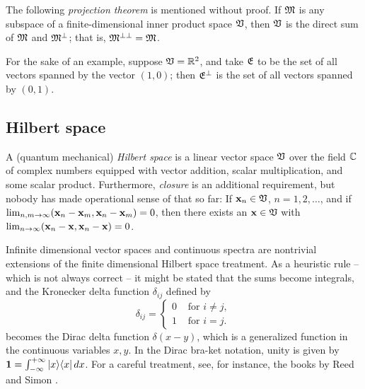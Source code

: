 The following {\em projection theorem}
is mentioned without proof.
If ${\frak M}$ is any subspace of a finite-dimensional inner product space ${\frak V}$,
then ${\frak V}$ is the direct sum of ${\frak M}$ and ${\frak M}^\perp$;
that is, ${\frak M}^{\perp \perp}={\frak M}$.

{
\color{blue}
\bexample
For the sake of an example, suppose ${\frak V}={\Bbb R}^2$,
and take ${\frak E}$ to be the set of all vectors spanned by the vector $(1,0)$;
then ${\frak E}^\perp$ is the set of all vectors spanned by $(0,1)$.
\eexample
}


\subsection{Hilbert space}


A (quantum mechanical) {\em Hilbert space} is a linear
vector space ${\frak V}$ over the field ${\Bbb C}$ of complex numbers
equipped with vector addition, scalar multiplication, and some scalar product.
Furthermore, {\em closure} is an additional requirement,
but nobody has made operational sense of that so far:
If ${\bf x}_n\in {\frak V}$, $n=1,2,\ldots$, and if $\lim_{n,m\rightarrow
\infty} ({\bf x}_n-{\bf x}_m,{\bf x}_n-{\bf x}_m)=0$,
then there exists an ${\bf x}\in {\frak V}$ with
$\lim_{n\rightarrow \infty} ({\bf x}_n-{\bf x},{\bf x}_n-{\bf x})=0$.





Infinite dimensional vector spaces and continuous spectra are nontrivial
extensions of the finite
dimensional Hilbert space treatment. As a heuristic rule -- which is not
always correct -- it might be
stated that the sums become integrals, and the Kronecker delta function
$\delta_{ij}$ defined by
\begin{equation}
\delta_{ij} =\begin{cases}
0  &\text{ for }i\neq j , \\
1  &\text{ for }i = j.
\end{cases}
\end{equation}
becomes the Dirac delta function $\delta (x-y)$, which is a
generalized function in the continuous variables $x,y$.
In the Dirac bra-ket notation, unity is given by
${\bf 1}=\int_{-\infty}^{+\infty} \vert x\rangle \langle  x\vert \, dx$.
For a careful treatment, see, for instance,
the books by
Reed and Simon \cite{reed-sim1,reed-sim2}.


